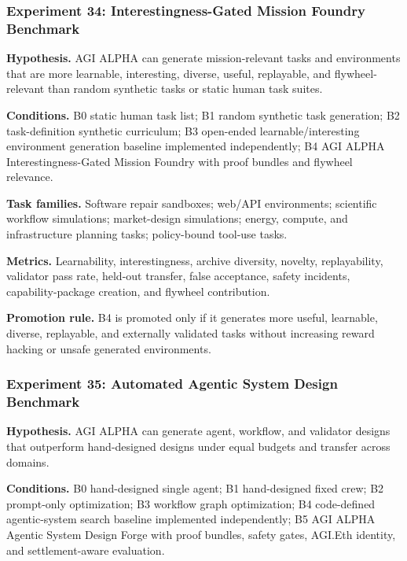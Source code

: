 \subsubsection{Experiment 34: Interestingness-Gated Mission Foundry
Benchmark}\label{experiment-34-interestingness-gated-mission-foundry-benchmark}

\textbf{Hypothesis.} AGI ALPHA can generate mission-relevant tasks and
environments that are more learnable, interesting, diverse, useful,
replayable, and flywheel-relevant than random synthetic tasks or static
human task suites.

\textbf{Conditions.} B0 static human task list; B1 random synthetic task
generation; B2 task-definition synthetic curriculum; B3 open-ended
learnable/interesting environment generation baseline implemented
independently; B4 AGI ALPHA Interestingness-Gated Mission Foundry with
proof bundles and flywheel relevance.

\textbf{Task families.} Software repair sandboxes; web/API environments;
scientific workflow simulations; market-design simulations; energy,
compute, and infrastructure planning tasks; policy-bound tool-use tasks.

\textbf{Metrics.} Learnability, interestingness, archive diversity,
novelty, replayability, validator pass rate, held-out transfer, false
acceptance, safety incidents, capability-package creation, and flywheel
contribution.

\textbf{Promotion rule.} B4 is promoted only if it generates more
useful, learnable, diverse, replayable, and externally validated tasks
without increasing reward hacking or unsafe generated environments.

\subsubsection{Experiment 35: Automated Agentic System Design
Benchmark}\label{experiment-35-automated-agentic-system-design-benchmark}

\textbf{Hypothesis.} AGI ALPHA can generate agent, workflow, and
validator designs that outperform hand-designed designs under equal
budgets and transfer across domains.

\textbf{Conditions.} B0 hand-designed single agent; B1 hand-designed
fixed crew; B2 prompt-only optimization; B3 workflow graph optimization;
B4 code-defined agentic-system search baseline implemented
independently; B5 AGI ALPHA Agentic System Design Forge with proof
bundles, safety gates, AGI.Eth identity, and settlement-aware
evaluation.


